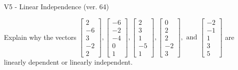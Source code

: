 \begin{exercise}
  \begin{exerciseTitle}V5 - Linear Independence (ver. 64)\end{exerciseTitle}
  \begin{exerciseStatement}
    Explain why the vectors \(\left[\begin{array}{r}
2 \\
-6 \\
3 \\
-2 \\
2
\end{array}\right] , \left[\begin{array}{r}
-6 \\
-2 \\
-4 \\
0 \\
1
\end{array}\right] , \left[\begin{array}{r}
2 \\
3 \\
1 \\
-5 \\
1
\end{array}\right] , \left[\begin{array}{r}
0 \\
2 \\
2 \\
-2 \\
3
\end{array}\right] , \text{ and } \left[\begin{array}{r}
-2 \\
-1 \\
1 \\
3 \\
5
\end{array}\right]\) are linearly dependent or linearly independent.	



\end{exerciseStatement}
\end{exercise}
